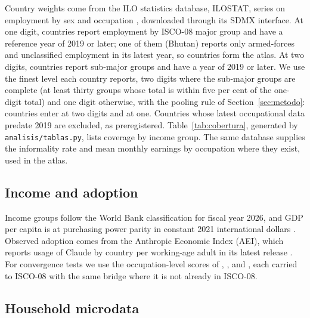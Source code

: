 Country weights come from the ILO statistics database, ILOSTAT, series on employment by sex and occupation \citep{ilostat2026}, downloaded through its SDMX interface.
At one digit,  countries report employment by ISCO-08 major group and  have a reference year of 2019 or later; one of them (Bhutan) reports only armed-forces and unclassified employment in its latest year, so  countries form the atlas.
At two digits,  countries report sub-major groups and  have a year of 2019 or later.
We use the finest level each country reports, two digits where the sub-major groups are complete (at least thirty groups whose total is within five per cent of the one-digit total) and one digit otherwise, with the pooling rule of Section~\ref{sec:metodo}:  countries enter at two digits and  at one.
Countries whose latest occupational data predate 2019 are excluded, as preregistered.
Table~\ref{tab:cobertura}, generated by \texttt{analisis/tablas.py}, lists coverage by income group.
The same database supplies the informality rate and mean monthly earnings by occupation where they exist, used in the atlas.

\subsection{Income and adoption}

Income groups follow the World Bank classification for fiscal year 2026, and GDP per capita is at purchasing power parity in constant 2021 international dollars \citep{worldbank2026income}.
Observed adoption comes from the Anthropic Economic Index (AEI), which reports usage of Claude by country per working-age adult in its latest release \citep{aei2025economic}.
For convergence tests we use the occupation-level scores of \citet{eloundou2024gpts}, \citet{felten2021occupational}, \citet{webb2020impact} and \citet{eisfeldt2023generative}, each carried to ISCO-08 with the same bridge where it is not already in ISCO-08.

\subsection{Household microdata}

